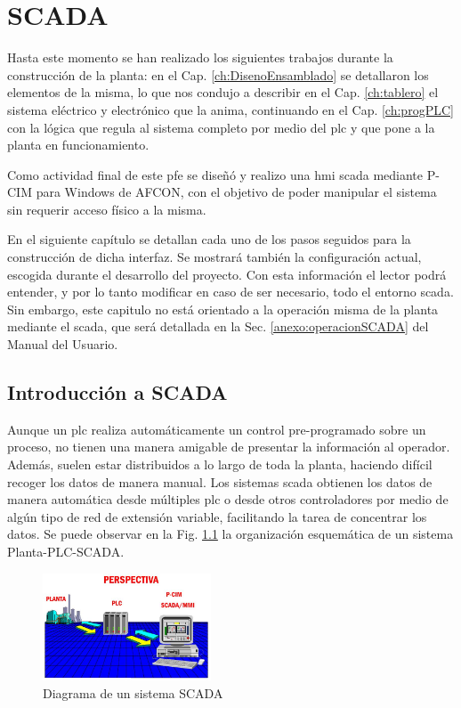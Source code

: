 \chapter{SCADA}
\label{ch:scada}

Hasta este momento se han realizado los siguientes trabajos durante la
construcción de la planta: en el Cap.
\ref{ch:DisenoEnsamblado} se detallaron los elementos de la misma, lo que nos
condujo a describir en el Cap. \ref{ch:tablero} el sistema eléctrico y
electrónico que la anima, continuando en el Cap. \ref{ch:progPLC} con la
lógica que regula al sistema completo por medio del \gls{plc} y que pone a la 
planta en funcionamiento. 

Como actividad final de este \gls{pfe} se diseñó y realizo una \gls{hmi}
\gls{scada} mediante P-CIM para Windows de AFCON, con el objetivo de poder
manipular el sistema sin requerir acceso físico a la misma.

En el siguiente capítulo se detallan cada uno de los pasos seguidos para la 
construcción de dicha interfaz.
Se mostrará también la configuración actual, escogida durante el desarrollo del
proyecto.
Con esta información el lector podrá entender, y por lo
tanto modificar en caso de ser necesario, todo el entorno \gls{scada}. Sin
embargo, este capitulo no está orientado a la operación misma de la planta
mediante el \gls{scada}, que será detallada en la Sec.
\ref{anexo:operacionSCADA} del Manual del Usuario. 

\section{Introducción a SCADA}
\label{sec:IntroScada}
Aunque un \gls{plc} realiza automáticamente un control pre-programado sobre un 
proceso, no tienen una manera amigable de presentar la información al operador.
Además, suelen estar distribuidos a lo largo de toda la planta, haciendo
difícil recoger los datos de manera manual.
Los sistemas \gls{scada} obtienen los datos de manera
automática desde múltiples \gls{plc} o desde otros controladores por medio de 
algún tipo de red de extensión variable, facilitando la tarea de concentrar 
los datos. Se puede observar en la Fig. \ref{fig:perspectivaSCADA} la
organización esquemática de un sistema Planta-PLC-SCADA.
\begin{figure}[ht!]
	\centering
	\includegraphics[width=0.445\textwidth]
	{Cap5-SCADA/images/perspectiva.jpeg}
	\caption{Diagrama de un sistema SCADA}
	\label{fig:perspectivaSCADA}
\end{figure}

